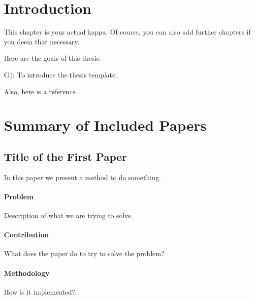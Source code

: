 \chapter{Introduction}
\label{chap:introduction}
This chapter is your actual kappa.
%
Of course, you can also add further chapters if you deem that necessary.

Here are the goals of this thesis:
\begin{LaTeXdescription}
 \item[G1:] To introduce the thesis template.
\end{LaTeXdescription}

Also, here is a reference \cite{liebel16sosym}.



\chapter{Summary of Included Papers}
\label{chap:summary}

\section{Title of the First Paper}

In this paper we present a method to do something.

\subsubsection*{Problem}

Description of what we are trying to solve.


\subsubsection*{Contribution}

What does the paper do to try to solve the problem?


\subsubsection*{Methodology}

How is it implemented?


\clearpage


